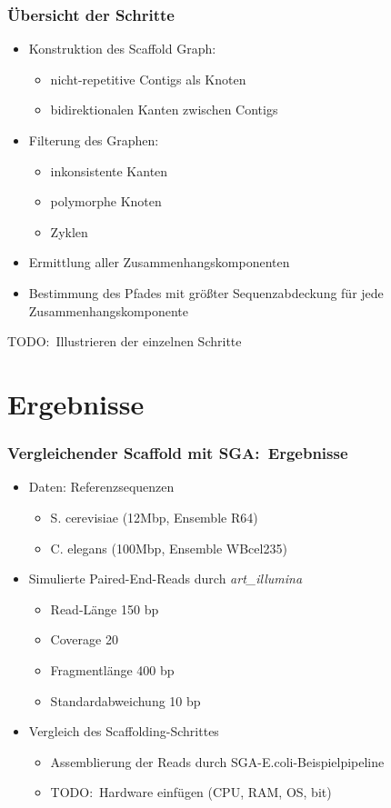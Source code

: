 \documentclass[xcolor=pst]{beamer}
\begin{document}
\begin{frame}
  \frametitle{Übersicht der Schritte}
  \begin{itemize}
  \item Konstruktion des Scaffold Graph:
    \begin{itemize}
    \item nicht-repetitive Contigs als Knoten
    \item bidirektionalen Kanten zwischen Contigs
    \end{itemize}
  \item Filterung des Graphen:
    \begin{itemize}
    \item inkonsistente Kanten
    \item polymorphe Knoten
    \item Zyklen
    \end{itemize}
  \item Ermittlung aller Zusammenhangskomponenten
  \item Bestimmung des Pfades mit größter Sequenzabdeckung für jede
    Zusammenhangskomponente
  \end{itemize}
  TODO:\ Illustrieren der einzelnen Schritte
\end{frame}

\section{Ergebnisse}

\begin{frame}
  \frametitle{Vergleichender Scaffold mit SGA:\ Ergebnisse}
  \begin{itemize}
    \item Daten: Referenzsequenzen
    \begin{itemize}
      \item S. cerevisiae (12Mbp, Ensemble R64)
      \item C. elegans (100Mbp, Ensemble WBcel235)
    \end{itemize}
    \item Simulierte Paired-End-Reads durch \textit{art\_illumina}
    \begin{itemize}
      \item Read-Länge 150 bp
      \item Coverage 20
      \item Fragmentlänge 400 bp
      \item Standardabweichung 10 bp
    \end{itemize}
    \item Vergleich des Scaffolding-Schrittes
    \begin{itemize}
      \item Assemblierung der Reads durch SGA-E.coli-Beispielpipeline
      \item TODO:\ Hardware einfügen (CPU, RAM, OS, bit)
    \end{itemize}
  \end{itemize}
  \let\thefootnote\relax{}
\end{frame}
\end{document}
